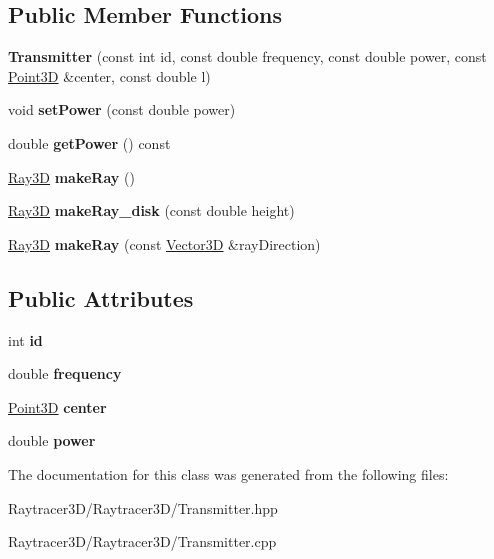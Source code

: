\subsection*{Public Member Functions}
\begin{DoxyCompactItemize}
\item 
\hypertarget{class_transmitter_a91c51bc1d7c42db81fb390753de5c0ea}{}\label{class_transmitter_a91c51bc1d7c42db81fb390753de5c0ea} 
{\bfseries Transmitter} (const int id, const double frequency, const double power, const \hyperlink{class_point3_d}{Point3D} \&center, const double l)
\item 
\hypertarget{class_transmitter_aa26f745526cba27666812ca7c05b9df7}{}\label{class_transmitter_aa26f745526cba27666812ca7c05b9df7} 
void {\bfseries set\+Power} (const double power)
\item 
\hypertarget{class_transmitter_a72eb7b0c29d6d5e3429f9920dcdf86c9}{}\label{class_transmitter_a72eb7b0c29d6d5e3429f9920dcdf86c9} 
double {\bfseries get\+Power} () const
\item 
\hypertarget{class_transmitter_a8a2727ad1e4b48ec9f64c0285bb5bd04}{}\label{class_transmitter_a8a2727ad1e4b48ec9f64c0285bb5bd04} 
\hyperlink{class_ray3_d}{Ray3D} {\bfseries make\+Ray} ()
\item 
\hypertarget{class_transmitter_a7c51cee738e95fb6f2af955986873b7c}{}\label{class_transmitter_a7c51cee738e95fb6f2af955986873b7c} 
\hyperlink{class_ray3_d}{Ray3D} {\bfseries make\+Ray\+\_\+disk} (const double height)
\item 
\hypertarget{class_transmitter_a5c6bdf0d0dd931f9f4282a7d585f2320}{}\label{class_transmitter_a5c6bdf0d0dd931f9f4282a7d585f2320} 
\hyperlink{class_ray3_d}{Ray3D} {\bfseries make\+Ray} (const \hyperlink{class_vector3_d}{Vector3D} \&ray\+Direction)
\end{DoxyCompactItemize}
\subsection*{Public Attributes}
\begin{DoxyCompactItemize}
\item 
\hypertarget{class_transmitter_a3e57cbedcf7ff80c3506c47d43119f5d}{}\label{class_transmitter_a3e57cbedcf7ff80c3506c47d43119f5d} 
int {\bfseries id}
\item 
\hypertarget{class_transmitter_ade036fee92a7f2aad8ecf206f89b8c34}{}\label{class_transmitter_ade036fee92a7f2aad8ecf206f89b8c34} 
double {\bfseries frequency}
\item 
\hypertarget{class_transmitter_a61c6aa4371c98b49d2d9277fd4447f34}{}\label{class_transmitter_a61c6aa4371c98b49d2d9277fd4447f34} 
\hyperlink{class_point3_d}{Point3D} {\bfseries center}
\item 
\hypertarget{class_transmitter_ac339f9fd3011afdbdc729b99b371e617}{}\label{class_transmitter_ac339f9fd3011afdbdc729b99b371e617} 
double {\bfseries power}
\end{DoxyCompactItemize}


The documentation for this class was generated from the following files\+:\begin{DoxyCompactItemize}
\item 
Raytracer3\+D/\+Raytracer3\+D/Transmitter.\+hpp\item 
Raytracer3\+D/\+Raytracer3\+D/Transmitter.\+cpp\end{DoxyCompactItemize}
